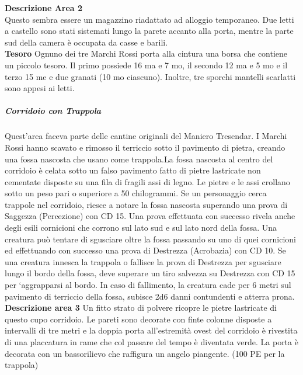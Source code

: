 \documentclass{article}
\begin{document}
        \textbf{Descrizione Area 2} \\ Questo sembra essere un magazzino riadattato ad alloggio
        temporaneo. Due letti a castello sono stati sistemati lungo la
        parete accanto alla porta, mentre la parte sud della camera è
        occupata da casse e barili.\\
        \textbf{Tesoro} Ognuno dei tre Marchi Rossi porta alla cintura una borsa
        che contiene un piccolo tesoro. Il primo possiede 16 ma e 7
        mo, il secondo 12 ma e 5 mo e il terzo 15 me e due granati
        (10 mo ciascuno). Inoltre, tre sporchi mantelli scarlatti sono
        appesi ai letti.


            \subparagraph{Corridoio con Trappola} Quest'area faceva parte delle cantine originali del Maniero
            Tresendar. I Marchi Rossi hanno scavato e rimosso il
            terriccio sotto il pavimento di pietra, creando una fossa
            nascosta che usano come trappola.La fossa nascosta al centro del corridoio è celata sotto un
            falso pavimento fatto di pietre lastricate non cementate
            disposte su una fila di fragili assi di legno. Le pietre e le assi
            crollano sotto un peso pari o superiore a 50 chilogrammi. Se
            un personaggio cerca trappole nel corridoio, riesce a notare la
            fossa nascosta superando una prova di Saggezza (Percezione)
            con CD 15. Una prova effettuata con successo rivela anche
            degli esili cornicioni che corrono sul lato sud e sul lato nord
            della fossa. Una creatura può tentare di sgusciare oltre la
            fossa passando su uno di quei cornicioni ed effettuando con
            successo una prova di Destrezza (Acrobazia) con CD 10.
            Se una creatura innesca la trappola o fallisce la prova
            di Destrezza per sgusciare lungo il bordo della fossa, deve
            superare un tiro salvezza su Destrezza con CD 15 per
            ‘aggrapparsi al bordo. In caso di fallimento, la creatura cade
            per 6 metri sul pavimento di terriccio della fossa, subisce 2d6
            danni contundenti e atterra prona.\\
            \textbf{Descrizione area 3} Un fitto strato di polvere ricopre le pietre lastricate di questo cupo corridoio. Le pareti sono decorate con finte colonne
            disposte a intervalli di tre metri e la doppia porta all'estremità
            ovest del corridoio è rivestita di una placcatura in rame che col
            passare del tempo è diventata verde. La porta è decorata con
            un bassorilievo che raffigura un angelo piangente. (100 PE per la trappola)\\
\end{document}
